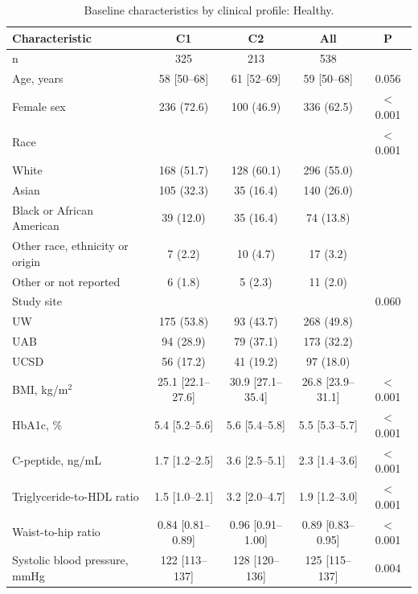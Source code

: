 \begin{table}[htbp]
\centering
\footnotesize
\caption{Baseline characteristics by clinical profile: Healthy.}
\label{tab:baseline-healthy}
\begin{tabular}{lcccc}
\toprule
Characteristic & C1 & C2 & All & P \\
\midrule
n & 325 & 213 & 538 &  \\
Age, years & 58 [50--68] & 61 [52--69] & 59 [50--68] & 0.056 \\
Female sex & 236 (72.6) & 100 (46.9) & 336 (62.5) & $<$0.001 \\
Race &  &  &  & $<$0.001 \\
\hspace{1em}White & 168 (51.7) & 128 (60.1) & 296 (55.0) &  \\
\hspace{1em}Asian & 105 (32.3) & 35 (16.4) & 140 (26.0) &  \\
\hspace{1em}Black or African American & 39 (12.0) & 35 (16.4) & 74 (13.8) &  \\
\hspace{1em}Other race, ethnicity or origin & 7 (2.2) & 10 (4.7) & 17 (3.2) &  \\
\hspace{1em}Other or not reported & 6 (1.8) & 5 (2.3) & 11 (2.0) &  \\
Study site &  &  &  & 0.060 \\
\hspace{1em}UW & 175 (53.8) & 93 (43.7) & 268 (49.8) &  \\
\hspace{1em}UAB & 94 (28.9) & 79 (37.1) & 173 (32.2) &  \\
\hspace{1em}UCSD & 56 (17.2) & 41 (19.2) & 97 (18.0) &  \\
BMI, kg/m$^2$ & 25.1 [22.1--27.6] & 30.9 [27.1--35.4] & 26.8 [23.9--31.1] & $<$0.001 \\
HbA1c, \% & 5.4 [5.2--5.6] & 5.6 [5.4--5.8] & 5.5 [5.3--5.7] & $<$0.001 \\
C-peptide, ng/mL & 1.7 [1.2--2.5] & 3.6 [2.5--5.1] & 2.3 [1.4--3.6] & $<$0.001 \\
Triglyceride-to-HDL ratio & 1.5 [1.0--2.1] & 3.2 [2.0--4.7] & 1.9 [1.2--3.0] & $<$0.001 \\
Waist-to-hip ratio & 0.84 [0.81--0.89] & 0.96 [0.91--1.00] & 0.89 [0.83--0.95] & $<$0.001 \\
Systolic blood pressure, mmHg & 122 [113--137] & 128 [120--136] & 125 [115--137] & 0.004 \\

\end{tabular}
\end{table}

